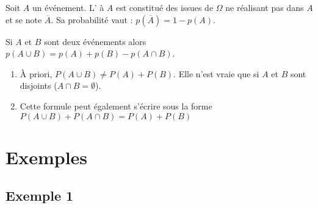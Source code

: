 \begin{definition}
   Soit $A$ un événement. L' à $A$ est constitué des issues de $\Omega$ ne réalisant pas dans $A$ et se note $\overline{A}$. Sa probabilité vaut :  $p(\overline{A})=1-p(A)$.
\end{definition}




\begin{propriete}
   Si $A$ et $B$ sont deux événements alors $p(A\cup B)=p(A)+p(B)-p(A\cap B)$.

\end{propriete}

\begin{remarque}
    \begin{enumerate}
     \item \`A priori, $P(A\cup B)\neq P(A)+P(B)$. Elle n'est vraie que si $A$ et $B$ sont disjoints ($A\cap B=\emptyset$).
    \item Cette formule peut également s'écrire sous la forme $P(A\cup B)+P(A\cap B)=P(A)+P(B)$

    \end{enumerate}
\end{remarque}


%
%
%
%
%

\section{Exemples}

	\subsection{Exemple 1}
	
\begin{center}
\end{center}
	

